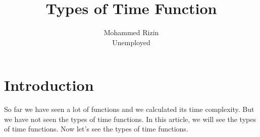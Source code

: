 \documentclass[twocolumn]{article}
\title{Types of Time Function}
\author{Mohammed Rizin \\ Unemployed}
\begin{document}
\maketitle

\section{Introduction}
So far we have seen a lot of functions and we calculated its time complexity. But we have not seen the types of time functions. In this article, we will see the types of time functions. 
Now let's see the types of time functions.
\end{document}
